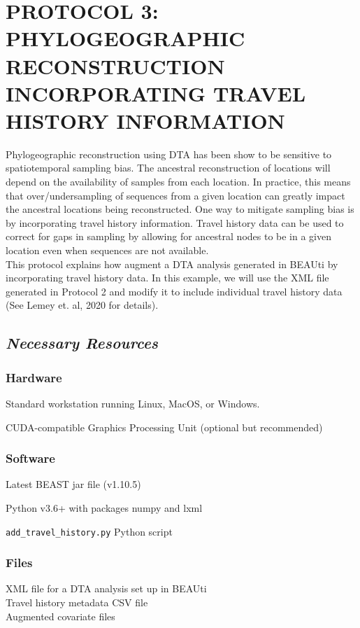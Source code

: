 \documentclass{article}
\begin{document}
\section*{PROTOCOL 3: PHYLOGEOGRAPHIC RECONSTRUCTION INCORPORATING TRAVEL HISTORY INFORMATION}

Phylogeographic reconstruction using DTA has been show to be sensitive to spatiotemporal sampling bias. The ancestral reconstruction of locations will depend on the availability of samples from each location. In practice, this means that over/undersampling of sequences from a given location can greatly impact the ancestral locations being reconstructed. One way to mitigate sampling bias is by incorporating travel history information. Travel history data can be used to correct for gaps in sampling by allowing for ancestral nodes to be in a given location even when sequences are not available. \\

This protocol explains how augment a DTA analysis generated in BEAUti by incorporating travel history data. In this example, we will use the XML file generated in Protocol 2 and modify it to include individual travel history data (See Lemey et. al, 2020 for details).

\subsection*{\textbf{\textit{Necessary Resources}}}
\subsubsection*{Hardware}
\hspace{0.5cm}Standard workstation running Linux, MacOS, or Windows.

\hspace{0.5cm}CUDA-compatible Graphics Processing Unit (optional but recommended)

\subsubsection*{Software}
\hspace{0.5cm}Latest BEAST jar file (v1.10.5)

\hspace{0.5cm}Python v3.6+ with packages numpy and lxml

\hspace{0.5cm}\verb|add_travel_history.py| Python script

\subsubsection*{Files}
XML file for a DTA analysis set up in BEAUti \\
Travel history metadata CSV file \\
Augmented covariate files \\
\end{document}
